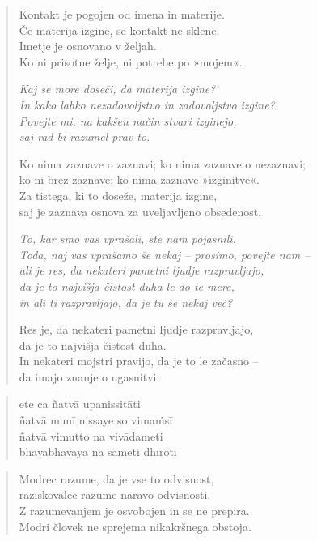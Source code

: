 \clearpage
\begin{verse}

Kontakt je pogojen od imena in materije.\\
Če materija izgine, se kontakt ne sklene.\\
Imetje je osnovano v željah.\\
Ko ni prisotne želje, ni potrebe po »mojem«.

\emph{Kaj se more doseči, da materija izgine?}\\
\emph{In kako lahko nezadovoljstvo in zadovoljstvo izgine?}\\
\emph{Povejte mi, na kakšen način stvari izginejo,}\\
\emph{saj rad bi razumel prav to.}

Ko nima zaznave o zaznavi; ko nima zaznave o nezaznavi;\\
ko ni brez zaznave; ko nima zaznave »izginitve«.\\
Za tistega, ki to doseže, materija izgine,\\
saj je zaznava osnova za uveljavljeno obsedenost.

\emph{To, kar smo vas vprašali, ste nam pojasnili.}\\
\emph{Toda, naj vas vprašamo še nekaj -- prosimo, povejte nam --}\\
\emph{ali je res, da nekateri pametni ljudje razpravljajo,}\\
\emph{da je to najvišja čistost duha le do te mere,}\\
\emph{in ali ti razpravljajo, da je tu še nekaj več?}

Res je, da nekateri pametni ljudje razpravljajo,\\
da je to najvišja čistost duha.\\
In nekateri mojstri pravijo, da je to le začasno --\\
da imajo znanje o ugasnitvi.

\end{verse}


\clearpage
\begin{verse}

ete ca ñatvā upanissitāti\\
ñatvā munī nissaye so vimaṁsī\\
ñatvā vimutto na vivādameti\\
bhavābhavāya na sameti dhīroti

\end{verse}


\clearpage
\begin{verse}

Modrec razume, da je vse to odvisnost,\\
raziskovalec razume naravo odvisnosti.\\
Z razumevanjem je osvobojen in se ne prepira.\\
Modri človek ne sprejema nikakršnega obstoja.

\end{verse}

